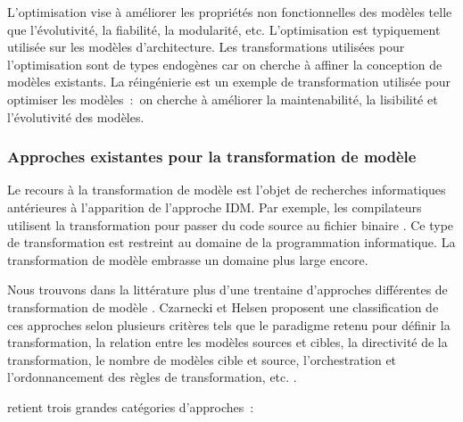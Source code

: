 \begin{description}
L'optimisation vise à améliorer les propriétés non fonctionnelles des modèles telle que l'évolutivité, la fiabilité, la modularité, etc. L'optimisation est typiquement utilisée sur les modèles d'architecture. Les transformations utilisées pour l'optimisation sont de types endogènes car on cherche à affiner la conception de modèles existants. La réingénierie est un exemple de transformation utilisée pour optimiser les modèles~:~on cherche à améliorer la maintenabilité, la lisibilité et l'évolutivité des modèles.

\end{description}

\subsubsection{Approches existantes pour la transformation de modèle}  
Le recours à la transformation de modèle est l'objet de recherches informatiques antérieures à l'apparition de l'approche IDM. Par exemple, les compilateurs utilisent la transformation pour passer du code source au fichier binaire \cite{aho1985compilers}. Ce type de transformation est restreint au domaine de la programmation informatique. La transformation de modèle embrasse un domaine plus large encore.

Nous trouvons dans la littérature plus d'une trentaine d'approches différentes de transformation de modèle \cite{syriani2011multi}. Czarnecki et Helsen proposent une classification de ces approches selon plusieurs critères tels que le paradigme retenu pour définir la transformation, la relation entre les modèles sources et cibles, la directivité de la transformation, le nombre de modèles cible et source, l'orchestration et l'ordonnancement des règles de transformation, etc. \cite{czarnecki2006feature}.

\cite{blanc2011mda} retient trois grandes catégories d'approches~:

